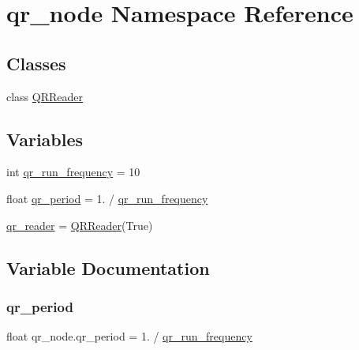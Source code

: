 \hypertarget{namespaceqr__node}{}\section{qr\+\_\+node Namespace Reference}
\label{namespaceqr__node}
\subsection*{Classes}
\begin{DoxyCompactItemize}
\item 
class \hyperlink{classqr__node_1_1QRReader}{Q\+R\+Reader}
\end{DoxyCompactItemize}
\subsection*{Variables}
\begin{DoxyCompactItemize}
\item 
int \hyperlink{namespaceqr__node_a31e85e3f8f81a5242b77220f7d159f8f}{qr\+\_\+run\+\_\+frequency} = 10
\item 
float \hyperlink{namespaceqr__node_aedd8f6438983c52e8853b9041701e76f}{qr\+\_\+period} = 1. / \hyperlink{namespaceqr__node_a31e85e3f8f81a5242b77220f7d159f8f}{qr\+\_\+run\+\_\+frequency}
\item 
\hyperlink{namespaceqr__node_a519fa7047cc55d22c70e2f91e84893c3}{qr\+\_\+reader} = \hyperlink{classqr__node_1_1QRReader}{Q\+R\+Reader}(True)
\end{DoxyCompactItemize}


\subsection{Variable Documentation}
\mbox{\label{namespaceqr__node_aedd8f6438983c52e8853b9041701e76f}} 
\subsubsection{\texorpdfstring{qr\+\_\+period}{qr\_period}}
{\footnotesize\ttfamily float qr\+\_\+node.\+qr\+\_\+period = 1. / \hyperlink{namespaceqr__node_a31e85e3f8f81a5242b77220f7d159f8f}{qr\+\_\+run\+\_\+frequency}}

\mbox{\label{namespaceqr__node_a519fa7047cc55d22c70e2f91e84893c3}} 
